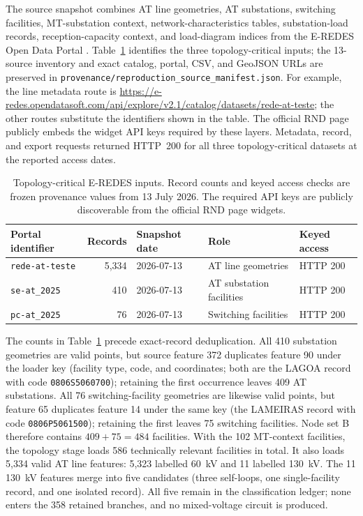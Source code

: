 \documentclass[10pt]{article}
\newcommand{\code}[1]{\texttt{#1}}
\begin{document}
The source snapshot combines AT line geometries, AT substations, switching facilities, MT-substation context, network-characteristics tables, substation-load records, reception-capacity context, and load-diagram indices from the E-REDES Open Data Portal \cite{EREDESOpenData2026}. Table~\ref{tab:source-inputs} identifies the three topology-critical inputs; the 13-source inventory and exact catalog, portal, CSV, and GeoJSON URLs are preserved in \code{provenance/reproduction\_source\_manifest.json}. For example, the line metadata route is \url{https://e-redes.opendatasoft.com/api/explore/v2.1/catalog/datasets/rede-at-teste}; the other routes substitute the identifiers shown in the table. The official RND page publicly embeds the widget API keys required by these layers. Metadata, record, and export requests returned HTTP~200 for all three topology-critical datasets at the reported access dates.

\begin{table}[t]
\centering
\small
\caption{Topology-critical E-REDES inputs. Record counts and keyed access checks are frozen provenance values from 13 July 2026. The required API keys are publicly discoverable from the official RND page widgets.}
\label{tab:source-inputs}
\begin{tabular}{p{}rp{}p{}p{}}
\toprule
Portal identifier & Records & Snapshot date & Role & Keyed access \\
\midrule
\code{rede-at-teste} & 5,334 & 2026-07-13 & AT line geometries & HTTP 200 \\
\code{se-at\_2025} & 410 & 2026-07-13 & AT substation facilities & HTTP 200 \\
\code{pc-at\_2025} & 76 & 2026-07-13 & Switching facilities & HTTP 200 \\
\bottomrule
\end{tabular}
\end{table}

The counts in Table~\ref{tab:source-inputs} precede exact-record deduplication. All 410 substation geometries are valid points, but source feature 372 duplicates feature 90 under the loader key (facility type, code, and coordinates; both are the LAGOA record with code \code{0806S5060700}); retaining the first occurrence leaves 409 AT substations. All 76 switching-facility geometries are likewise valid points, but feature 65 duplicates feature 14 under the same key (the LAMEIRAS record with code \code{0806P5061500}); retaining the first leaves 75 switching facilities. Node set B therefore contains $409+75=484$ facilities. With the 102 MT-context facilities, the topology stage loads 586 technically relevant facilities in total. It also loads 5,334 valid AT line features: 5,323 labelled 60~kV and 11 labelled 130~kV. The 11 130~kV features merge into five candidates (three self-loops, one single-facility record, and one isolated record). All five remain in the classification ledger; none enters the 358 retained branches, and no mixed-voltage circuit is produced.
\end{document}
